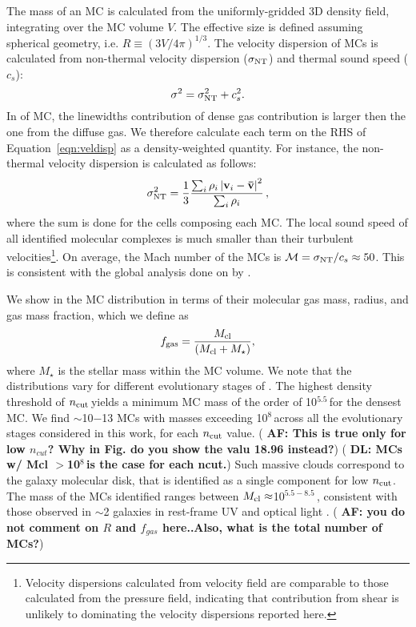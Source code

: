 \IfFileExists{emulateapjlegacy.cls}{\documentclass[iop]{emulateapjlegacy}}{\documentclass[iop]{emulateapj}}
\newcommand{\DL}[1]{({\bf \color{dlcolor} DL: #1})}
\newcommand{\AF}[1]{({\bf \color{afcolor} AF: #1})}
\begin{document}
The mass of an MC is calculated from the uniformly-gridded 3D density field, integrating over the MC volume $V$. The effective size is defined assuming spherical geometry, i.e. $R \equiv (3 V /4 \pi)^{1/3}$.
%
The velocity dispersion of MCs is calculated from non-thermal velocity dispersion ($\sigma_{\rm NT}$) and thermal sound speed ($c_s$):
\begin{equation}
\sigma^2 = \sigma_{\rm NT}^2 + c_s^2.
\label{eqn:veldisp}
\end{equation}
%
In \obs of MC, the linewidths contribution of dense gas contribution is larger then the one from the diffuse gas. We therefore calculate each term on the RHS of Equation~\ref{eqn:veldisp} as a density-weighted quantity. For instance, the non-thermal velocity dispersion is calculated as follows:
\begin{equation}
\sigma_{\rm NT}^2 = \frac{1}{{3}}\frac{\sum_{i} \rho_i \left|\mathbf{v}_i - \mathbf{\bar v}\right|^2}{\sum_i \rho_i}\,,
\end{equation}
where the sum is done for the cells composing each MC.
%
The local sound speed of all identified molecular complexes is much smaller than their turbulent velocities\footnote{Velocity dispersions calculated from velocity field are comparable to those calculated from the pressure field, indicating that contribution from shear is unlikely to dominating the velocity dispersions reported here.\label{ftn:veldisp}}. On average, the Mach number of the MCs is  $\mathcal{M} = \sigma_{\rm NT}/c_s\approx 50$. This is consistent with the global analysis done on \flower by \citet{Vallini18a}.

We show in  the MC distribution in terms of their molecular gas mass, radius, and gas mass fraction, which we define as
\begin{equation}
f_{\rm gas} = \frac{M_{\rm cl}} {\left(M_{\rm cl} + M_\star\right)},
\end{equation}
where $M_\star$ is the stellar mass within the MC volume.
%
We note that the distributions vary for different evolutionary stages of \flower. The highest density threshold of $n_{\rm cut}$\,\cc yields a minimum MC mass of the order of 10$^{5.5}$\,\Msun for the densest MC.
%
We find $\sim$10$-$13 MCs with masses exceeding 10$^8$\,\Msun across all the evolutionary stages considered in this work, for each  $n_{\rm cut}$ value. \AF{This is true only for low $n_{cut}$? Why in Fig. do you show the valu 18.96 instead?} \DL{MCs w/ Mcl $>$10$^8$\,\Msun is the case for each ncut.} Such massive clouds correspond to the galaxy molecular disk, that is identified as a single component for low $n_{\rm cut}$. The mass of the MCs identified ranges between $M_{\rm cl}\approx$10$^{5.5-8.5}$\,\Msun, consistent with those observed in \z$\sim$2 galaxies in rest-frame UV and optical light \citep{Elmegreen07a, Elmegreen09a}. \AF{you do not comment on $R$ and $f_{gas}$ here..Also, what is the total number of MCs?}
\end{document}
